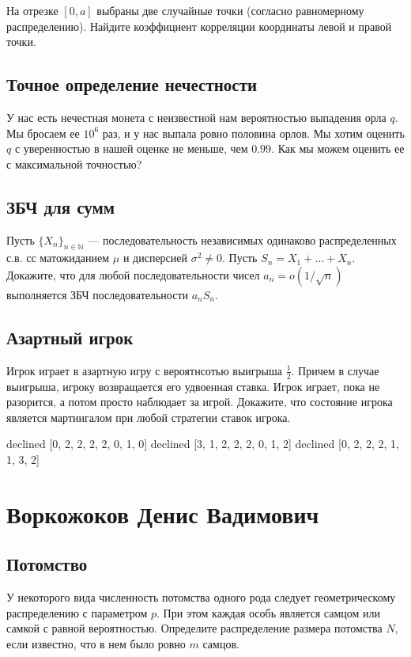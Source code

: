 \documentclass[12pt]{article}
\newcommand\N{\mathbb{N}}
\begin{document}
На отрезке $[0, a]$ выбраны две случайные точки (согласно равномерному распределению). Найдите коэффициент корреляции координаты левой и правой точки. 



\subsection{Точное определение нечестности}

У нас есть нечестная монета с неизвестной нам вероятностью выпадения орла $q$. Мы бросаем ее $10^6$ раз, и у нас выпала ровно половина орлов. Мы хотим оценить $q$ с уверенностью в нашей оценке не меньше, чем $0.99$. Как мы можем оценить ее с максимальной точностью? 



\subsection{ЗБЧ для сумм}
Пусть $\{X_n\}_{n \in \N}$ --- последовательность независимых одинаково распределенных с.в. сс матожиданием $\mu$ и дисперсией $\sigma^2 \ne 0$. Пусть $S_n = X_1 + \dots + X_n$. Докажите, что для любой последовательности чисел $a_n = o(1/\sqrt{n})$ выполняется ЗБЧ последовательности $a_n S_n$.



\subsection{Азартный игрок}

Игрок играет в азартную игру с вероятнсотью выигрыша $\frac{1}{2}$. Причем в случае выигрыша, игроку возвращается его удвоенная ставка. Игрок играет, пока не разорится, а потом просто наблюдает за игрой. Докажите, что состояние игрока является мартингалом при любой стратегии ставок игрока.



\newpage
declined  [0, 2, 2, 2, 2, 0, 1, 0]
declined  [3, 1, 2, 2, 2, 0, 1, 2]
declined  [0, 2, 2, 2, 1, 1, 3, 2]
\section{Воркожоков Денис Вадимович}

\subsection{Потомство}

У некоторого вида численность потомства одного рода следует геометрическому распределению с параметром $p$. При этом каждая особь является самцом или самкой с равной вероятностью. Определите распределение размера потомства $N$, если известно, что в нем было ровно $m$ самцов.
\end{document}
